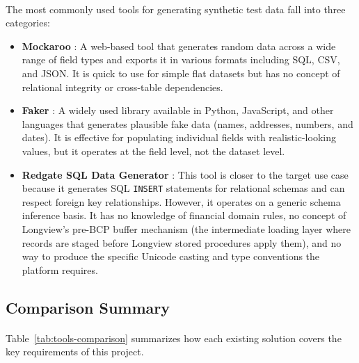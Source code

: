 \paragraph{}The most commonly used tools for generating synthetic test data
fall into three categories:

\begin{itemize}
    \item \textbf{Mockaroo} \cite{mockaroo}: A web-based tool that generates
    random data across a wide range of field types and exports it in various
    formats including SQL, CSV, and JSON. It is quick to use for simple flat
    datasets but has no concept of relational integrity or cross-table
    dependencies.

    \item \textbf{Faker} \cite{faker}: A widely
    used library available in Python, JavaScript, and other languages that
    generates plausible fake data (names, addresses, numbers, and dates).
    It is effective for populating individual fields with realistic-looking
    values, but it operates at the field level, not the dataset level.

    \item \textbf{Redgate SQL Data Generator} \cite{redgate}: This tool is
    closer to the target use case because it generates SQL \texttt{INSERT}
    statements for relational schemas and can respect foreign key
    relationships. However, it operates on a generic schema inference basis.
    It has no knowledge of financial domain rules, no concept of Longview's
    pre-BCP buffer mechanism (the intermediate loading layer where records
    are staged before Longview stored procedures apply them), and no way to
    produce the specific Unicode casting and type conventions the platform
    requires.
\end{itemize}


\subsection{Comparison Summary}

\paragraph{}Table~\ref{tab:tools-comparison} summarizes how each existing
solution covers the key requirements of this project.

